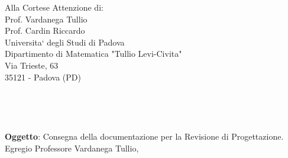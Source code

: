 \documentclass[11pt,a4paper]{letter}
\def\opening#1{\thispagestyle{empty}
{\centering\fromaddress \vspace{0.6in} \\ %
\hspace*{\longindentation}\hspace*{\fill}\par} %
{\raggedright \toname \\ \toaddress \par} %
\vspace{0.1in} %
\noindent #1 %
}
\begin{document}

\begin{letter}
{Alla Cortese Attenzione di:\\
	Prof. Vardanega Tullio\\
	Prof. Cardin Riccardo\\
	Universita` degli Studi di Padova\\
	Dipartimento di Matematica "Tullio Levi-Civita"\\
	Via Trieste, 63\\
	35121 - Padova (PD)\\
}



\opening{\textbf{Oggetto}: Consegna della documentazione per la Revisione di Progettazione.}\\

\noindent Egregio Professore Vardanega Tullio,


\end{letter}
\end{document}
